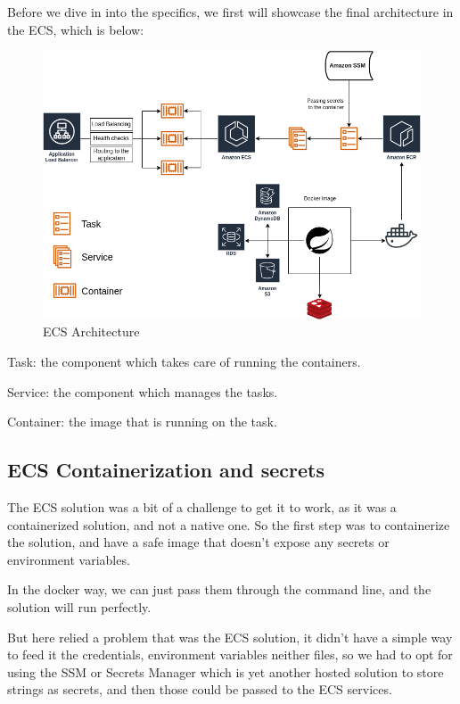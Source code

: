 Before we dive in into the specifics, we first will showcase the final architecture in the ECS, which is below:

\begin{figure}[!htbp]
    \centering
    \includegraphics[width=\textwidth]{images/ECS}
    \caption{\footnotesize{ECS Architecture}}
    \label{fig:ECSArch}
\end{figure}

Task: the component which takes care of running the containers.

Service: the component which manages the tasks.

Container: the image that is running on the task.

\subsection {ECS Containerization and secrets}

The ECS solution was a bit of a challenge to get it to work,
as it was a containerized solution, and not a native one.
So the first step was to containerize the solution, and have a safe image 
that doesn't expose any secrets or environment variables.

In the docker way, we can just pass them through the command line,
and the solution will run perfectly.

But here relied a problem that was the ECS solution, it didn't have a simple
way to feed it the credentials, environment variables neither files, so we had to opt
for using the SSM or Secrets Manager
which is yet another hosted solution to store strings as secrets, and then those could be 
passed to the ECS services.

